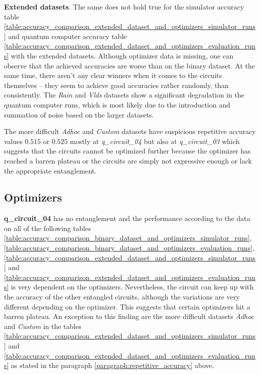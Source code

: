 \textbf{Extended datasets}. The same does not hold true for the simulator accuracy table \ref{table:accuracy_comparison_extended_dataset_and_optimizers_simulator_runs} and quantum computer accuracy table \ref{table:accuracy_comparison_extended_dataset_and_optimizers_evaluation_runs} with the extended datasets. Although  optimizer data is missing, one can observe that the achieved accuracies are worse than on the binary dataset. At the same time, there aren't any clear winners when it comes to the circuits themselves – they seem to achieve good accuracies rather randomly, than consistently. The \textit{Rain} and \textit{Vlds} datasets show a significant degradation in the quantum computer runs, which is most likely due to the introduction and summation of noise based on the larger datasets.\par
{}
\label{paragraph:repetitive_accuracy}
The more difficult \textit{Adhoc} and \textit{Custom} datasets have suspicious repetitive accuracy values $0.515$ or $0.525$ mostly at \textit{q\_circuit\_04} but also at \textit{q\_circuit\_03} which suggests that the circuits cannot be optimized further because the optimizer has reached a barren plateau or the circuits are simply not expressive enough or lack the appropriate entanglement.

\subsection{Optimizers}
\textbf{q\_circuit\_04} has no entanglement and the performance according to the data on all of the following tables \ref{table:accuracy_comparison_binary_dataset_and_optimizers_simulator_runs}, \ref{table:accuracy_comparison_binary_dataset_and_optimizers_evaluation_runs}, \ref{table:accuracy_comparison_extended_dataset_and_optimizers_simulator_runs} and \ref{table:accuracy_comparison_extended_dataset_and_optimizers_evaluation_runs} is very dependent on the optimizers. Nevertheless, the circuit can keep up with the accuracy of the other entangled circuits, although the variations are very different depending on the optimizer. This suggests that certain optimizers hit a barren plateau. An exception to this finding are the more difficult datasets \textit{Adhoc} and \textit{Custom} in the tables \ref{table:accuracy_comparison_extended_dataset_and_optimizers_simulator_runs} and \ref{table:accuracy_comparison_extended_dataset_and_optimizers_evaluation_runs} as stated in the paragraph \ref{paragraph:repetitive_accuracy} above.

